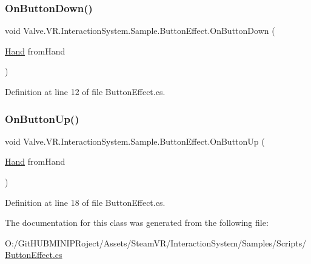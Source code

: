 \subsubsection{\texorpdfstring{OnButtonDown()}{OnButtonDown()}}
{\footnotesize\ttfamily void Valve.\+V\+R.\+Interaction\+System.\+Sample.\+Button\+Effect.\+On\+Button\+Down (\begin{DoxyParamCaption}\item[{\mbox{\hyperlink{class_valve_1_1_v_r_1_1_interaction_system_1_1_hand}{Hand}}}]{from\+Hand }\end{DoxyParamCaption})}



Definition at line 12 of file Button\+Effect.\+cs.

\mbox{\label{class_valve_1_1_v_r_1_1_interaction_system_1_1_sample_1_1_button_effect_a5e20475a006861edb4dedca140eb49bf}} 
\subsubsection{\texorpdfstring{OnButtonUp()}{OnButtonUp()}}
{\footnotesize\ttfamily void Valve.\+V\+R.\+Interaction\+System.\+Sample.\+Button\+Effect.\+On\+Button\+Up (\begin{DoxyParamCaption}\item[{\mbox{\hyperlink{class_valve_1_1_v_r_1_1_interaction_system_1_1_hand}{Hand}}}]{from\+Hand }\end{DoxyParamCaption})}



Definition at line 18 of file Button\+Effect.\+cs.



The documentation for this class was generated from the following file\+:\begin{DoxyCompactItemize}
\item 
O\+:/\+Git\+H\+U\+B\+M\+I\+N\+I\+P\+Roject/\+Assets/\+Steam\+V\+R/\+Interaction\+System/\+Samples/\+Scripts/\mbox{\hyperlink{_button_effect_8cs}{Button\+Effect.\+cs}}\end{DoxyCompactItemize}
